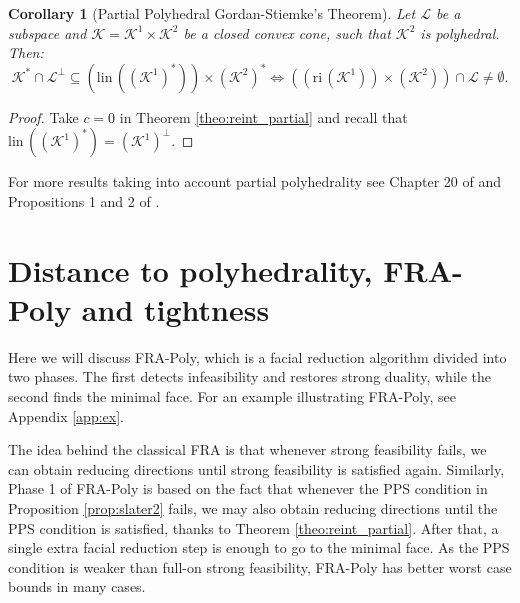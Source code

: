 \documentclass{article}
\newcommand{\reInt}{\mathrm{ri}\,}
\newcommand{\lineality}{\mathrm{lin}\,}
\newcommand{\stdCone}{ {\mathcal{K}}}
\newcommand{\stdSpace}{ \mathcal{L}}
\newcommand{\PPS}{{PPS}}
\newtheorem{corollary}[definition]{Corollary}
\begin{document}
\begin{corollary}[Partial Polyhedral Gordan-Stiemke's Theorem]\label{theo:partial_Gordan-Stiemke}\label{col:partial_gordan}
Let $\stdSpace$ be a subspace and $\stdCone = \stdCone ^1 \times \stdCone ^2$ be a 
closed convex cone, such that $\stdCone ^2$ is polyhedral. Then:
\begin{equation*}
\stdCone^* \cap \stdSpace^{\perp} \subseteq (\lineality(( \stdCone ^1)^*)) \times (\stdCone ^2)^* \Leftrightarrow  \left( (\reInt ({\stdCone^1}))\times (\stdCone^2) \right)\cap \stdSpace  \neq \emptyset.
\end{equation*}
\end{corollary}
\begin{proof}
Take $c = 0$ in Theorem \ref{theo:reint_partial} and recall that $\lineality(( \stdCone ^1)^*) = (\stdCone^1)^\perp$.
\end{proof}

For more results taking into account partial polyhedrality see Chapter 20 of 
\cite{rockafellar} and Propositions 1 and 2 of \cite{lourenco_muramatsu_tsuchiya2}.






\section{Distance to polyhedrality, FRA-Poly and tightness}\label{sec:fra_poly}
Here we will discuss FRA-Poly, which is 
a facial reduction algorithm divided into two phases. The first detects infeasibility and 
restores strong duality, while the second finds the minimal face. For an example illustrating 
FRA-Poly, see Appendix \ref{app:ex}.

The idea behind the classical FRA is that whenever strong feasibility 
fails, we can obtain reducing directions until strong feasibility is satisfied 
again. Similarly, Phase 1 of FRA-Poly is based on
the fact that whenever the {\PPS} condition in Proposition \ref{prop:slater2}  fails, we may 
also obtain reducing directions until the {\PPS} condition is satisfied, thanks to Theorem \ref{theo:reint_partial}. 
After that, a single extra facial reduction step is enough to go to the minimal face.
 As the {\PPS} condition is weaker than full-on strong feasibility, FRA-Poly 
has better worst case bounds  in many cases.
\end{document}
